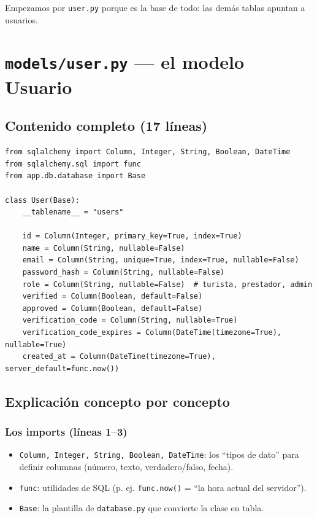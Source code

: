 \documentclass[11pt,a4paper]{article}
\begin{document}
Empezamos por \texttt{user.py} porque es la base de todo: las demás tablas apuntan a usuarios.

\section{\texttt{models/user.py} --- el modelo Usuario}

\subsection{Contenido completo (17 líneas)}

\begin{lstlisting}
from sqlalchemy import Column, Integer, String, Boolean, DateTime
from sqlalchemy.sql import func
from app.db.database import Base

class User(Base):
    __tablename__ = "users"

    id = Column(Integer, primary_key=True, index=True)
    name = Column(String, nullable=False)
    email = Column(String, unique=True, index=True, nullable=False)
    password_hash = Column(String, nullable=False)
    role = Column(String, nullable=False)  # turista, prestador, admin
    verified = Column(Boolean, default=False)
    approved = Column(Boolean, default=False)
    verification_code = Column(String, nullable=True)
    verification_code_expires = Column(DateTime(timezone=True), nullable=True)
    created_at = Column(DateTime(timezone=True), server_default=func.now())
\end{lstlisting}

\subsection{Explicación concepto por concepto}

\subsubsection{Los imports (líneas 1--3)}

\begin{itemize}
    \item \texttt{Column, Integer, String, Boolean, DateTime}: los ``tipos de dato'' para
    definir columnas (número, texto, verdadero/falso, fecha).
    \item \texttt{func}: utilidades de SQL (p. ej. \texttt{func.now()} = ``la hora actual del servidor'').
    \item \texttt{Base}: la plantilla de \texttt{database.py} que convierte la clase en tabla.
\end{itemize}
\end{document}
